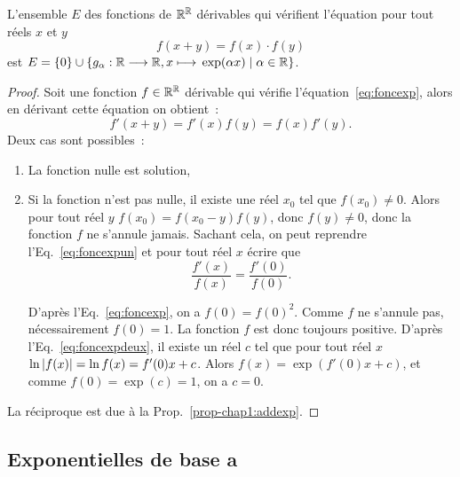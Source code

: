 \begin{theo}
  L'ensemble \(E\) des fonctions de \(\mathbb{R}^{\mathbb{R}}\) dérivables qui vérifient 
  l'équation pour tout réels \(x\) et \(y\)
  \begin{equation}\label{eq:foncexp}
    f(x+y) = f(x) \cdot f(y)
  \end{equation}
  est \(E = \left\{0\right\} \cup 
  \left\{g_{\alpha}:\mathbb{R} \longrightarrow{} \mathbb{R}, x \longmapsto{} \exp(\alpha x)\mathrel{}\middle|\mathrel{}\alpha \in \mathbb{R}\right\}\).
\end{theo}

\begin{proof}
  Soit une fonction \(f \in \mathbb{R}^{\mathbb{R}}\) dérivable qui vérifie l'équation~\eqref{eq:foncexp},
  alors en dérivant cette équation on obtient~:
  \begin{equation}\label{eq:foncexpun}
    f'(x+y) = f'(x)f(y) = f(x)f'(y).
  \end{equation}
  Deux cas sont possibles~:
  \begin{enumerate}
    \item La fonction nulle est solution,
    \item Si la fonction n'est pas nulle, il existe une réel \(x_0\) tel que 
      \(f(x_0) \neq 0\). Alors pour tout réel \(y\) \(f(x_0)= f(x_0-y)f(y)\), 
      donc \(f(y) \neq 0\), donc la fonction \(f\) ne s'annule jamais. Sachant 
      cela, on peut reprendre l'Eq.~\eqref{eq:foncexpun} et pour tout réel \(x\) 
      écrire que           \begin{equation}\label{eq:foncexpdeux}
        \frac{f'(x)}{f(x)} = \frac{f'(0)}{f(0)}.
      \end{equation}

      D'après l'Eq.~\eqref{eq:foncexp}, on a \(f(0) = {f(0)}^2\).
      Comme \(f\) ne s'annule pas, nécessairement \(f(0) = 1\). La fonction 
      \(f\) est donc toujours positive. D'après l'Eq.~\eqref{eq:foncexpdeux}, il 
      existe un réel \(c\) tel que pour tout réel \(x\) \(\ln \left\lvert f(x)\right\rvert = \ln 
      f(x) = f'(0) x + c\). Alors \(f(x) = \exp(f'(0) x +c)\), et comme \(f(0) = 
      \exp(c) = 1\), on a \(c = 0\).
  \end{enumerate}

  La réciproque est due à la Prop.~\ref{prop-chap1:addexp}.
\end{proof}

\subsection{Exponentielles de base a}\label{subsec:chap1-expa}

